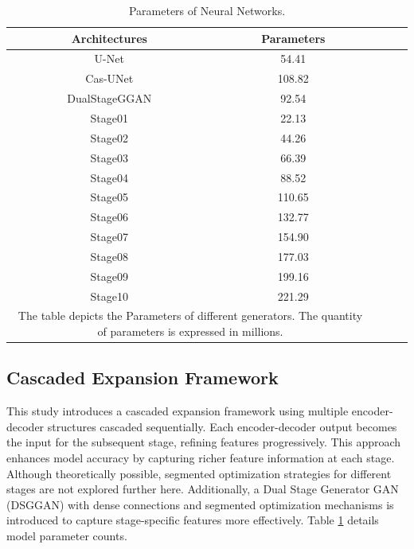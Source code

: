 \documentclass[a4paper, times, 10pt,twocolumn]{article}
\begin{document}
\begin{table}[h]
	\centering
	\caption{Parameters of Neural Networks.}
	\label{tab:model_parameters}
	\begin{tabular}{ccccc}
		\hline
		Architectures                                                   & Parameters \\
		\hline
		U-Net\cite{navab_u-net_2015}                                    & 54.41      \\
		Cas-UNet\cite{zeng_swin-casunet_2022}                           & 108.82     \\
		DualStageGGAN\cite{wang_dsg-gandual-stage-generator-based_2024} & 92.54      \\
		Stage01                                                         & 22.13      \\
		Stage02                                                         & 44.26      \\
		Stage03                                                         & 66.39      \\
		Stage04                                                         & 88.52      \\
		Stage05                                                         & 110.65     \\
		Stage06                                                         & 132.77     \\
		Stage07                                                         & 154.90     \\
		Stage08                                                         & 177.03     \\
		Stage09                                                         & 199.16     \\
		Stage10                                                         & 221.29     \\
		\hline
		\multicolumn{2}{p{201pt}}{The table depicts the Parameters of different generators. The quantity of parameters is expressed in millions.}
	\end{tabular}
\end{table}

\subsection{Cascaded Expansion Framework}
This study introduces a cascaded expansion framework using multiple encoder-decoder structures cascaded sequentially. Each encoder-decoder output becomes the input for the subsequent stage, refining features progressively. This approach enhances model accuracy by capturing richer feature information at each stage. Although theoretically possible, segmented optimization strategies for different stages are not explored further here. Additionally, a Dual Stage Generator GAN (DSGGAN) with dense connections and segmented optimization mechanisms is introduced to capture stage-specific features more effectively. Table \ref{tab:model_parameters} details model parameter counts.
\end{document}
